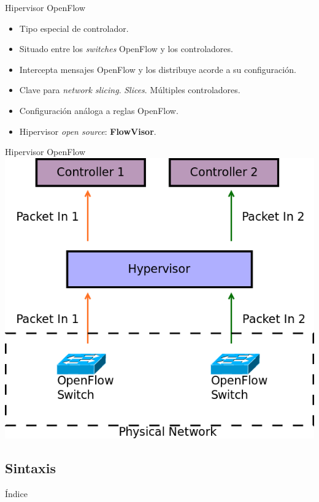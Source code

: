 \documentclass{beamer}
\begin{document}
\begin{frame}{Hipervisor OpenFlow}
    \begin{itemize}
        \item Tipo especial de controlador.
        \item Situado entre los \textit{switches} OpenFlow y los controladores.
        \item Intercepta mensajes OpenFlow y los distribuye acorde a su configuración.
        \item Clave para \textit{network slicing}. \textit{Slices}. Múltiples controladores.
        \item Configuración análoga a reglas OpenFlow.
        \item Hipervisor \textit{open source}: \textbf{FlowVisor}.
    \end{itemize}
\end{frame}

\begin{frame}{Hipervisor OpenFlow}\vspace{10pt}
    \centering
    \includegraphics[scale=0.39]{hypervisor.png}
\end{frame}

\subsection{Sintaxis}
\begin{frame}{Índice}
    \begin{columns}[t]
        \begin{column}{1.7in}
            \tableofcontents[currentsection, subsectionstyle=show/shaded/hide, sections={1-4}]
        \end{column}
        \begin{column}{1.7in}
            \tableofcontents[currentsection, subsectionstyle=show/shaded/hide, sections={5-7}]
        \end{column}
    \end{columns}
\end{frame}
\end{document}
